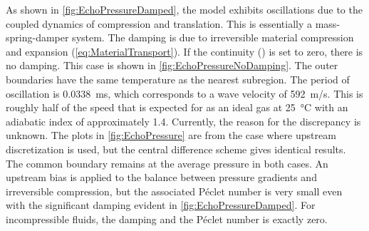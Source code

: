 As shown in \autoref{fig:EchoPressureDamped}, the model exhibits oscillations due to the coupled dynamics of compression and translation.  This is essentially a mass-spring-damper system.  The damping is due to irreversible material compression and expansion (\autoref{eq:MaterialTransport}).  If the continuity () is set to zero, there is no damping.  This case is shown in \autoref{fig:EchoPressureNoDamping}.  The outer boundaries have the same temperature as the nearest subregion.  The period of oscillation is \SI{0.0338}{ms}, which corresponds to a wave velocity of \SI{592}{m/s}.  This is roughly half of the speed that is expected for  as an ideal gas at \SI{25}{\celsius} with an adiabatic index of approximately 1.4.  Currently, the reason for the discrepancy is unknown.  The plots in \autoref{fig:EchoPressure} are from the case where upstream discretization is used, but the central difference scheme gives identical results.  The common boundary remains at the average pressure in both cases.  An upstream bias is applied to the balance between pressure gradients and irreversible compression, but the associated P\'eclet number is very small even with the significant damping evident in \autoref{fig:EchoPressureDamped}.  For incompressible fluids, the damping and the P\'eclet number is exactly zero.

